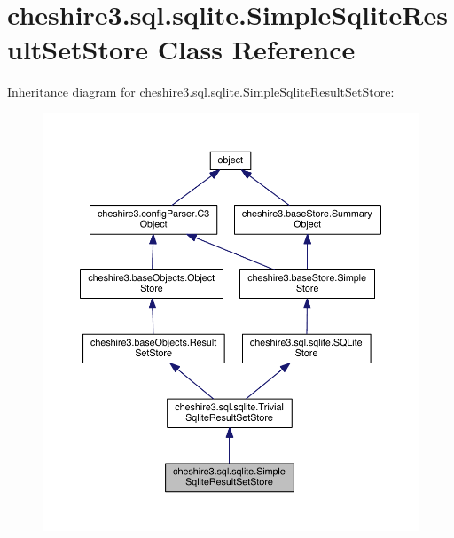 \hypertarget{classcheshire3_1_1sql_1_1sqlite_1_1_simple_sqlite_result_set_store}{\section{cheshire3.\-sql.\-sqlite.\-Simple\-Sqlite\-Result\-Set\-Store Class Reference}
\label{classcheshire3_1_1sql_1_1sqlite_1_1_simple_sqlite_result_set_store}
}


Inheritance diagram for cheshire3.\-sql.\-sqlite.\-Simple\-Sqlite\-Result\-Set\-Store\-:
\nopagebreak
\begin{figure}[H]
\begin{center}
\leavevmode
\includegraphics[width=350pt]{classcheshire3_1_1sql_1_1sqlite_1_1_simple_sqlite_result_set_store__inherit__graph}
\end{center}
\end{figure}



